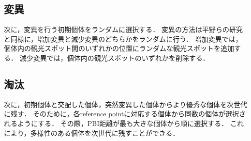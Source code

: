 \subsection{変異}\label{sec:突然}
次に，変異を行う初期個体をランダムに選択する．
変異の方法は平野らの研究\cite{平野}と同様に，増加変異と減少変異のどちらかをランダムに行う．
増加変異では，個体内の観光スポット間のいずれかの位置にランダムな観光スポットを追加する．
減少変異では，個体内の観光スポットのいずれかを削除する．
\subsection{淘汰}\label{sec:淘汰}
次に，初期個体と交配した個体，突然変異した個体からより優秀な個体を次世代に残す．
そのために，各reference pointに対応する個体から同数の個体が選択されるようにする．
その際，PBI距離が最も大きな個体から順に選択する．
これにより，多様性のある個体を次世代に残すことができる．

		

